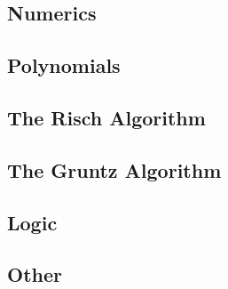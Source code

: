 

\subsection{Numerics}

\subsection{Polynomials}

\subsection{The Risch Algorithm}

\subsection{The Gruntz Algorithm}

\subsection{Logic}

\subsection{Other}
